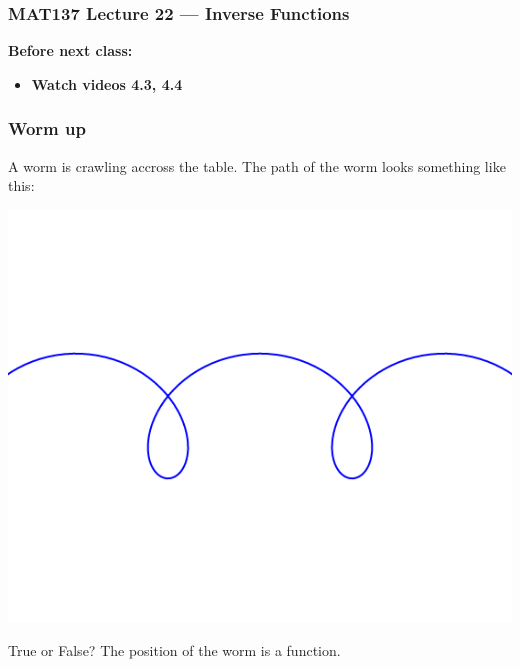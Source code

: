 \documentclass[14pt]{beamer}
\date{}
\title{}
\author{}
\begin{document}


\begin{frame}
	\frametitle{MAT137 Lecture 22 --- Inverse Functions}

	\vfill
	{\bf Before next class:}
		\begin{itemize} \normalsize
			\item {\bf Watch videos  4.3, 4.4}
		\end{itemize}
\end{frame}

\begin{frame}[t]
\frametitle{Worm up}



A worm is crawling accross the table.  The path of the worm looks something like this:


	\begin{center}
		\includegraphics[scale=.3]{G11}
	\end{center}

\vspace{-1cm}

\begin{block}{True or False?}
The position of the worm is a function.
\end{block}

\end{frame}
\end{document}
